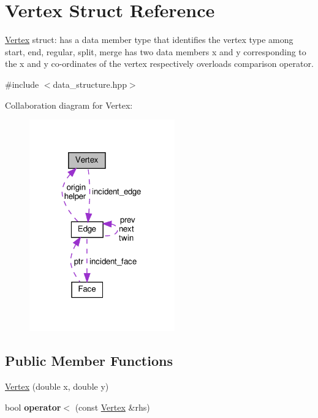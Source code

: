 \hypertarget{structVertex}{}\section{Vertex Struct Reference}
\label{structVertex}


\hyperlink{structVertex}{Vertex} struct\+: has a data member type that identifies the vertex type among start, end, regular, split, merge has two data members x and y corresponding to the x and y co-\/ordinates of the vertex respectively overloads comparison operator.  




{\ttfamily \#include $<$data\+\_\+structure.\+hpp$>$}



Collaboration diagram for Vertex\+:
\nopagebreak
\begin{figure}[H]
\begin{center}
\leavevmode
\includegraphics[width=178pt]{structVertex__coll__graph}
\end{center}
\end{figure}
\subsection*{Public Member Functions}
\begin{DoxyCompactItemize}
\item 
\hyperlink{structVertex_a2927de87e482ddebbb18abf7f811c6c3}{Vertex} (double x, double y)
\item 
\mbox{\label{structVertex_a666b9e590347fa9a3e10d468ae6d6836}} 
bool {\bfseries operator$<$} (const \hyperlink{structVertex}{Vertex} \&rhs)
\end{DoxyCompactItemize}
